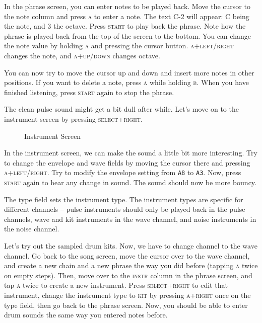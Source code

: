 In the phrase screen, you can enter notes to be played back. Move the cursor to the note
column and press \textsc{a} to enter a note. The text C-2 will appear: C being the note, and 3 the
octave. Press \textsc{start} to play back the phrase. Note how the phrase is played back from the
top of the screen to the bottom. You can change the note value by holding \textsc{a} and pressing the
cursor button. \textsc{a+left/right} changes the note, and \textsc{a+up/down} changes octave.

You can now try to move the cursor up and down and insert more notes in other positions. If
you want to delete a note, press \textsc{a} while holding \textsc{b}. When you have finished listening, press
\textsc{start} again to stop the phrase.

The clean pulse sound might get a bit dull after while. Let's move on to the instrument
screen by pressing \textsc{select+right}.

\begin{figure}[hbtp]
\centering
{}
\caption{Instrument Screen}
\label{fig:instr}
\end{figure}

In the instrument screen, we can make the sound a little bit more interesting. Try to change
the envelope and wave fields by moving the cursor there and pressing \textsc{a+left/right}. Try
to modify the envelope setting from \texttt{A8} to \texttt{A3}. Now, press \textsc{start} again to hear any
change in sound. The sound should now be more bouncy.

The type field sets the instrument type. The instrument types are specific for different
channels -- pulse instruments should only be played back in the pulse channels, wave and kit
instruments in the wave channel, and noise instruments in the noise channel.

Let's try out the sampled drum kits. Now, we have to change channel to the wave channel.
Go back to the song screen, move the cursor over to the wave channel, and create a new
chain and a new phrase the way you did before (tapping \textsc{a} twice on empty steps). Then,
move over to the \textsc{instr} column in the phrase screen, and tap \textsc{a} twice to create a new
instrument. Press \textsc{select+right} to edit that instrument, change the instrument type to
\textsc{kit} by pressing \textsc{a+right} once on the type field, then go back to the phrase screen. Now,
you should be able to enter drum sounds the same way you entered notes before.

